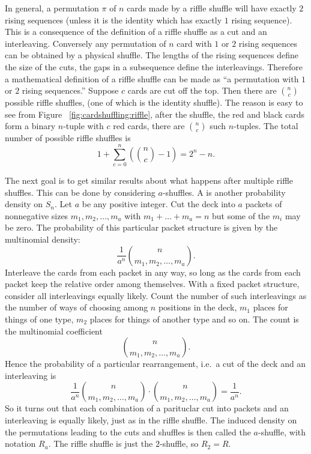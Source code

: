 \documentclass[12pt]{article}
\begin{document}
In general, a permutation \( \pi \) of \( n \) cards made by a riffle
shuffle will have exactly \( 2 \) rising sequences (unless it is the
identity which has exactly \( 1 \) rising sequence).  This is a
consequence of the definition of a riffle shuffle as a cut and an
interleaving.   Conversely any permutation of \( n
\) card with \( 1 \) or \( 2 \) rising sequences can be obtained by a
physical shuffle.  The lengths of the rising sequences define the size
of the cuts, the gaps in a subsequence define the interleavings.
Therefore a mathematical definition of a riffle
shuffle can be made as ``a permutation with \( 1 \) or \( 2 \) rising
sequences.'' Suppose \( c \) cards are cut off the top.  Then there are \(
\binom{n}{c} \) possible riffle shuffles, (one of which is the identity
shuffle).  The reason is easy to see from Figure~%
\ref{fig:cardshuffling:riffle}, after the shuffle, the red and black
cards form a binary \( n \)-tuple with \( c \) red cards, there are \(
\binom{n}{c} \) such \( n \)-tuples.  The total number of possible
riffle shuffles is
\[
    1 + \sum\limits_{c=0}^n \left( \binom{n}{c} - 1\right) = 2^n - n.
\]

The next goal is to get similar results about what happens after
multiple riffle shuffles.  This can be done by considering \( a \)-shuffles.
A  is another probability density on \( S_n \).
Let \( a \) be any positive integer.  Cut the deck into \( a \) packets
of nonnegative sizes \( m_1, m_2, \dots, m_a \) with \( m_1 + \dots + m_a
= n \) but some of the \( m_i \) may be zero.  The probability of this
particular packet structure is given by the multinomial density:
\[
    \frac{1}{a^n} \binom{n}{m_1, m_2, \dots, m_a}.
  \] Interleave the cards from each packet in any way,
  so long as the cards from each packet keep the
relative order among themselves.  With a fixed packet structure,
consider all interleavings equally likely.  Count the number of such
interleavings as the number of ways of choosing among \( n \) positions
in the deck, \( m_1 \) places for things of one type, \( m_2 \) places
for things of another type and so on.  The count is the multinomial
coefficient
\[
    \binom{n}{m_1, m_2, \dots, m_a}.
\] Hence the probability of a particular rearrangement, i.e.\ a cut of
the deck and an interleaving is
\[
    \frac{1}{a^n} \binom{n}{m_1, m_2, \dots, m_a} \cdot \binom{n}{m_1, m_2,
    \dots, m_a} = \frac{1}{a^n}.
\] So it turns out that each combination of a parituclar cut into
packets and an interleaving is equally likely, just as in the riffle
shuffle.  The induced density on the permutations leading to the cuts
and shuffles is then called the \( a \)-shuffle,%
with notation \( R_a \).  The riffle shuffle is just the \( 2 \)-shuffle,
so \( R_2 = R \).
\end{document}
